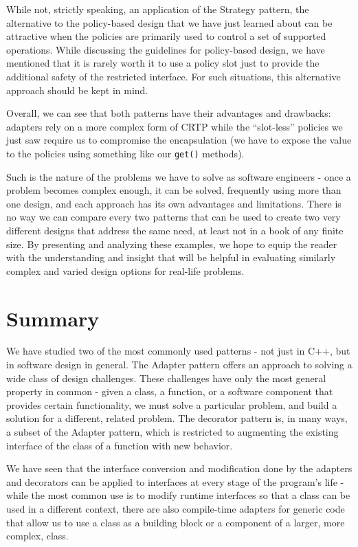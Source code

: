 While not, strictly speaking, an application of the Strategy pattern, the alternative to the policy-based design that we have just learned about can be attractive when the policies are primarily used to control a set of supported operations. While discussing the guidelines for policy-based design, we have mentioned that it is rarely worth it to use a policy slot just to provide the additional safety of the restricted interface. For such situations, this alternative approach should be kept in mind.

Overall, we can see that both patterns have their advantages and drawbacks: adapters rely on a more complex form of CRTP while the ``slot-less'' policies we just saw require us to compromise the encapsulation (we have to expose the value to the policies using something like our \texttt{get()} methods).

Such is the nature of the problems we have to solve as software engineers - once a problem becomes complex enough, it can be solved, frequently using more than one design, and each approach has its own advantages and limitations. There is no way we can compare every two patterns that can be used to create two very different designs that address the same need, at least not in a book of any finite size. By presenting and analyzing these examples, we hope to equip the reader with the understanding and insight that will be helpful in evaluating similarly complex and varied design options for real-life problems.

\section{Summary}

We have studied two of the most commonly used patterns - not just in C++, but in software design in general. The Adapter pattern offers an approach to solving a wide class of design challenges. These challenges have only the most general property in common - given a class, a function, or a software component that provides certain functionality, we must solve a particular problem, and build a solution for a different, related problem. The decorator pattern is, in many ways, a subset of the Adapter pattern, which is restricted to augmenting the existing interface of the class of a function with new behavior.

We have seen that the interface conversion and modification done by the adapters and decorators can be applied to interfaces at every stage of the program's life - while the most common use is to modify runtime interfaces so that a class can be used in a different context, there are also compile-time adapters for generic code that allow us to use a class as a building block or a component of a larger, more complex, class.

